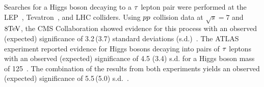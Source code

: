 Searches for a Higgs boson decaying to a $\tau$ lepton pair were performed at the LEP~\cite{Barate:2000ts,Abdallah:2003ip,Achard:2001pj,Abbiendi:2000ac},
Tevatron~\cite{Aaltonen:2012jh, Abazov:2012zj}, and LHC colliders.
Using $pp$ collision data at $\sqrt{s}=7$ and $8\mathrm{TeV}$, the CMS Collaboration showed evidence for this process with an observed\,(expected)
significance of 3.2\,(3.7) standard deviations (s.d.)~\cite{Chatrchyan:2014nva}. The ATLAS
experiment reported evidence for Higgs bosons decaying into pairs
of $\tau$ leptons with an observed (expected) significance of 4.5 (3.4)
s.d. for a Higgs boson mass of 125\GeV~\cite{Aad:2015vsa}.
The combination of the results from both experiments yields an observed (expected)
significance of 5.5\,(5.0) s.d.~\cite{Khachatryan:2016vau}.








